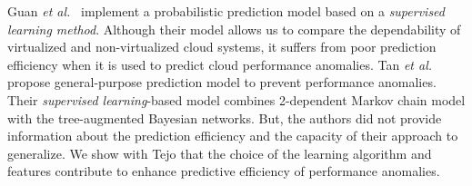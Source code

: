 Guan \emph{et al.}~\cite{guan2012cda} implement a probabilistic prediction model based on a \emph{supervised learning method}. Although their model allows us to compare the dependability of virtualized and non-virtualized cloud systems, it suffers from poor prediction efficiency when it is used to predict cloud performance anomalies. Tan \emph{et al.}~\cite{tan2012prepare} propose general-purpose prediction model to prevent performance anomalies. Their \emph{supervised learning}-based model combines 2-dependent Markov chain model with the tree-augmented Bayesian networks. But, the authors did not provide information about the prediction efficiency and the capacity of their approach to generalize. We show with Tejo that the choice of the learning algorithm and features contribute to enhance predictive efficiency of performance anomalies.

